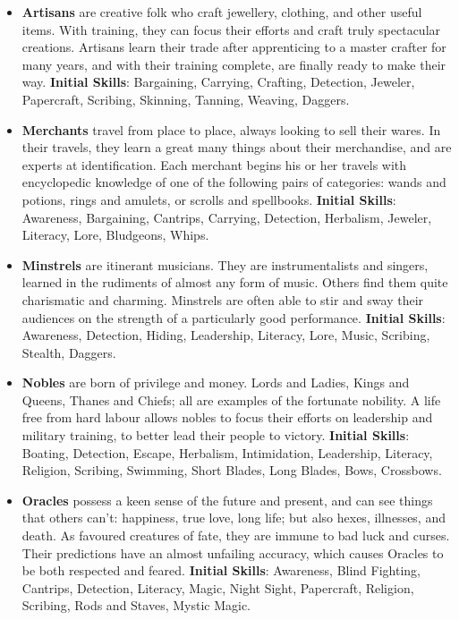 \begin{itemize}
\item {\bf Artisans} are creative folk who craft jewellery, clothing, and 
other useful items.  With training, they can focus their efforts and craft 
truly spectacular creations.  Artisans learn their trade after apprenticing
to a master crafter for many years, and with their training complete, are
finally ready to make their way.  \textbf{Initial Skills}: Bargaining,
Carrying, Crafting, Detection, Jeweler, Papercraft, Scribing, Skinning,
Tanning, Weaving, Daggers.

\item {\bf Merchants} travel from place to place, always looking to sell 
their wares.  In their travels, they learn a great many things about their 
merchandise, and are experts at identification.  Each merchant begins his 
or her travels with encyclopedic knowledge of one of the following pairs
of categories: wands and potions, rings and amulets, or scrolls and 
spellbooks.
\textbf{Initial Skills}: Awareness, Bargaining, Cantrips, Carrying,
Detection, Herbalism, Jeweler, Literacy, Lore, Bludgeons, Whips.

\item {\bf Minstrels} are itinerant musicians.  They are instrumentalists 
and singers, learned in the rudiments of almost any form of music.  Others 
find them quite charismatic and charming.  Minstrels are often able to stir
and sway their audiences on the strength of a particularly good performance.
\textbf{Initial Skills}: Awareness, Detection, Hiding, Leadership, 
Literacy, Lore, Music, Scribing, Stealth, Daggers.

\item {\bf Nobles} are born of privilege and money.  Lords and Ladies, 
Kings and Queens, Thanes and Chiefs; all are examples of the fortunate 
nobility.  A life free from hard labour allows nobles to focus their 
efforts on leadership and military training, to better lead their people 
to victory.  \textbf{Initial Skills}: Boating, Detection, Escape, 
Herbalism, Intimidation, Leadership, Literacy, Religion, Scribing,
Swimming, Short Blades, Long Blades, Bows, Crossbows.

\item {\bf Oracles} possess a keen sense of the future and present, and can
see things that others can't: happiness, true love, long life; but also 
hexes, illnesses, and death.  As favoured creatures of fate, they are 
immune to bad luck and curses.  Their predictions have an almost unfailing 
accuracy, which causes Oracles to be both respected and feared.
\textbf{Initial Skills}: Awareness, Blind Fighting, Cantrips, Detection,
Literacy, Magic, Night Sight, Papercraft, Religion, Scribing, Rods and
Staves, Mystic Magic.


\end{itemize}
